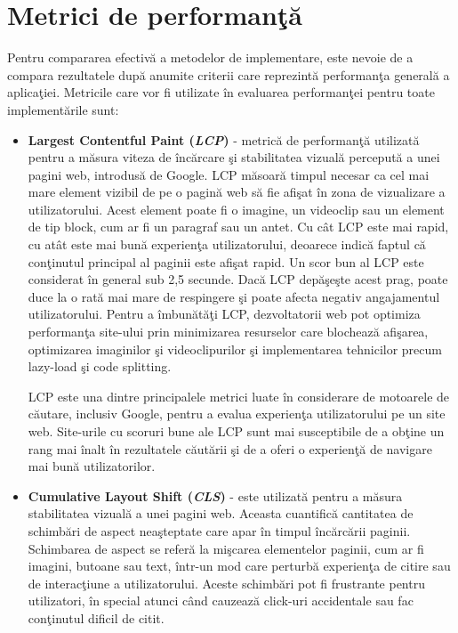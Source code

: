 \documentclass[12pt, a4paper]{report}
\begin{document}
\section{Metrici de performan\c t\u a}

Pentru compararea efectiv\u a a metodelor de implementare, este nevoie de a compara rezultatele dup\u a anumite criterii care reprezint\u a performan\c ta general\u a a aplica\c tiei.
Metricile care vor fi utilizate \^in evaluarea performan\c tei pentru toate implement\u arile sunt:

\begin{itemize}
	\item \textbf{Largest Contentful Paint (\emph{LCP})} - metric\u a de performan\c t\u a utilizat\u a pentru a m\u asura viteza de \^inc\u arcare \c si stabilitatea vizual\u a perceput\u a a unei pagini web, introdus\u a de Google. LCP m\u asoar\u a timpul necesar ca cel mai mare element vizibil de pe o pagin\u a web s\u a fie afi\c sat \^in zona de vizualizare a utilizatorului. Acest element poate fi o imagine, un videoclip sau un element de tip block, cum ar fi un paragraf sau un antet. Cu c\^at LCP este mai rapid, cu at\^at este mai bun\u a experien\c ta utilizatorului, deoarece indic\u a faptul c\u a con\c tinutul principal al paginii este afi\c sat rapid. Un scor bun al LCP este considerat \^in general sub 2,5 secunde. Dac\u a LCP dep\u a\c se\c ste acest prag, poate duce la o rat\u a mai mare de respingere \c si poate afecta negativ angajamentul utilizatorului. Pentru a \^imbun\u at\u a\c ti LCP, dezvoltatorii web pot optimiza performan\c ta site-ului prin minimizarea resurselor care blocheaz\u a afi\c sarea, optimizarea imaginilor \c si videoclipurilor \c si implementarea tehnicilor precum lazy-load \c si code splitting.

	      LCP este una dintre principalele metrici luate \^in considerare de motoarele de c\u autare, inclusiv Google, pentru a evalua experien\c ta utilizatorului pe un site web. Site-urile cu scoruri bune ale LCP sunt mai susceptibile de a ob\c tine un rang mai \^inalt \^in rezultatele c\u aut\u arii \c si de a oferi o experien\c t\u a de navigare mai bun\u a utilizatorilor. \cite{lcp}
	\item \textbf{Cumulative Layout Shift (\emph{CLS})} - este utilizat\u a pentru a m\u asura stabilitatea vizual\u a a unei pagini web. Aceasta cuantific\u a cantitatea de schimb\u ari de aspect nea\c steptate care apar \^in timpul \^inc\u arc\u arii paginii. Schimbarea de aspect se refer\u a la mi\c scarea elementelor paginii, cum ar fi imagini, butoane sau text, \^intr-un mod care perturb\u a experien\c ta de citire sau de interac\c tiune a utilizatorului. Aceste schimb\u ari pot fi frustrante pentru utilizatori, \^in special atunci c\^and cauzeaz\u a click-uri accidentale sau fac con\c tinutul dificil de citit.


\end{itemize}
\end{document}
